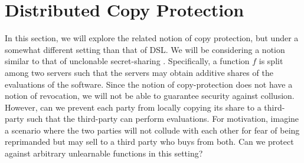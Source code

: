 \section{Distributed Copy Protection}\label{sec:dcp}

In this section, we will explore the related notion of copy
protection, but under a somewhat different setting than that of DSL.
We will be considering a notion similar to that of unclonable
secret-sharing \cite{}. Specifically, a function $f$ is split among
two servers such that the servers may obtain additive shares of the
evaluations of the software. Since the notion of copy-protection
does not have a notion of revocation, we will not be able to
guarantee security against collusion. However, can we prevent each
party from locally copying its share to a third-party such that
the third-party can perform evaluations. For motivation, imagine a
scenario where the two parties will not collude with each other for
fear of being reprimanded but may sell to a third party who buys
from both. Can we protect against arbitrary unlearnable functions in
this setting?

\cite{}
